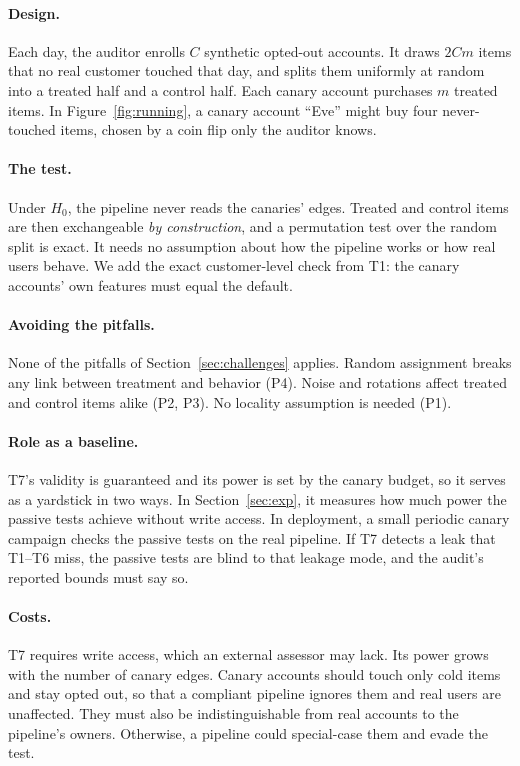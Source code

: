 \documentclass[10pt,twocolumn,letterpaper]{article}
\theoremstyle{definition}
\begin{document}
\paragraph{Design.}
Each day, the auditor enrolls $C$ synthetic opted-out accounts. It draws $2Cm$
items that no real customer touched that day, and splits them uniformly at
random into a treated half and a control half. Each canary account purchases
$m$ treated items. In Figure~\ref{fig:running}, a canary account ``Eve'' might
buy four never-touched items, chosen by a coin flip only the auditor knows.

\paragraph{The test.}
Under $H_0$, the pipeline never reads the canaries' edges. Treated and control
items are then exchangeable \emph{by construction}, and a permutation test over
the random split is exact. It needs no assumption about how the pipeline works
or how real users behave. We add the exact customer-level check from T1: the
canary accounts' own features must equal the default.

\paragraph{Avoiding the pitfalls.}
None of the pitfalls of Section~\ref{sec:challenges} applies. Random assignment
breaks any link between treatment and behavior (P4). Noise and rotations affect
treated and control items alike (P2, P3). No locality assumption is needed
(P1).

\paragraph{Role as a baseline.}
T7's validity is guaranteed and its power is set by the canary budget, so it
serves as a yardstick in two ways. In Section~\ref{sec:exp}, it measures how
much power the passive tests achieve without write access. In deployment, a
small periodic canary campaign checks the passive tests on the real pipeline.
If T7 detects a leak that T1--T6 miss, the passive tests are blind to that
leakage mode, and the audit's reported bounds must say so.

\paragraph{Costs.}
T7 requires write access, which an external assessor may lack. Its power grows
with the number of canary edges. Canary accounts should touch only cold items
and stay opted out, so that a compliant pipeline ignores them and real users
are unaffected. They must also be indistinguishable from real accounts to the
pipeline's owners. Otherwise, a pipeline could special-case them and evade the
test.
\end{document}
